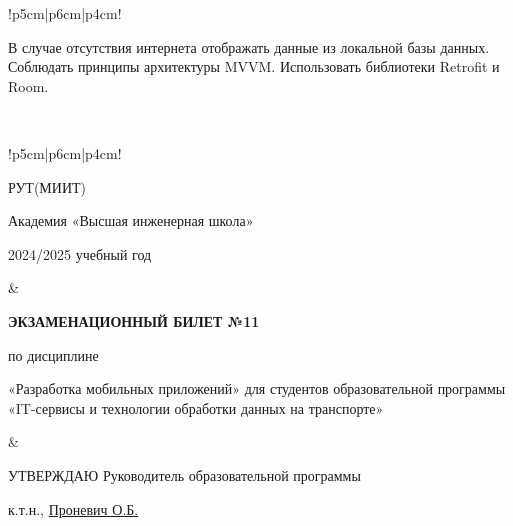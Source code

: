 \documentclass[a4paper]{article}
\begin{document}
\begin{tabular}{!{\vrule width 2pt}p{5cm}|p{6cm}|p{4cm}!{\vrule width 2pt}}
{\begin{minipage}{16cm}
\begin{enumerate}
В случае отсутствия интернета отображать данные из локальной базы данных.
Соблюдать принципы архитектуры MVVM.
Использовать библиотеки Retrofit и Room. 
\end{enumerate}

\vspace{0.2cm}
    
\end{minipage}
}
\\
\end{tabular}

\newpage


\begin{tabular}{!{\vrule width 2pt}p{5cm}|p{6cm}|p{4cm}!{\vrule width 2pt}}

    {\centering 
    \fontsize{14pt}{16pt}\selectfont
    РУТ(МИИТ)

\vspace{14pt}

Академия «Высшая инженерная школа»

\vspace{14pt}

2024/2025 учебный год

    }
&
{
    \centering
\fontsize{14pt}{16pt}\selectfont

\textbf{ЭКЗАМЕНАЦИОННЫЙ
БИЛЕТ №11}


по дисциплине 

«Разработка мобильных приложений» 
\fontsize{12pt}{14pt}\selectfont
для студентов образовательной программы «IT-сервисы и технологии обработки данных на транспорте»

}
&
{
\centering
\fontsize{14pt}{16pt}\selectfont

УТВЕРЖДАЮ
Руководитель образовательной программы

\vspace{1cm}

\fontsize{12pt}{14pt}\selectfont
\underline{\hspace{3cm}}

к.т.н., \underline{Проневич О.Б.}

}
\\
\hline
{}
\end{tabular}
\end{document}
